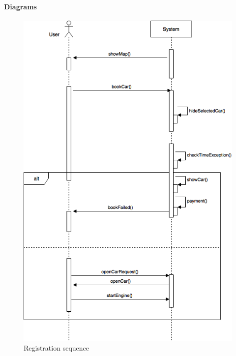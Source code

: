 \paragraph{Diagrams}
\begin{figure}[H]
   \begin{center}
    \includegraphics[width=\textwidth]{Resources/bookSequenceDiagram.png}
    \caption{Registration sequence}
   \end{center}
    \label{fig:bookCarSequence}
\end{figure}
